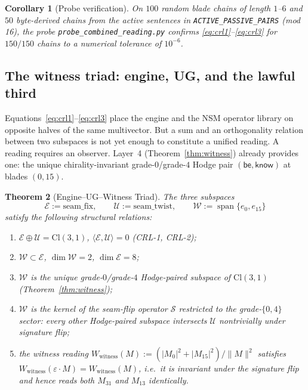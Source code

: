 \documentclass[11pt,a4paper]{article}
\theoremstyle{plain}
\newtheorem{theorem}{Theorem}[section]
\newtheorem{corollary}[theorem]{Corollary}
\theoremstyle{definition}
\theoremstyle{remark}
\numberwithin{equation}{section}
\providecommand{\Cl}{\mathrm{Cl}}
\providecommand{\eps}{\varepsilon}
\DeclareMathOperator{\Span}{span}
\begin{document}
\begin{corollary}[Probe verification]
\label{cor:crl-verified}
On $100$ random blade chains of length $1$--$6$ and $50$
byte-derived chains from the active sentences in
\texttt{ACTIVE\_PASSIVE\_PAIRS} (mod 16), the
probe \texttt{probe\_combined\_reading.py} confirms
\eqref{eq:crl1}--\eqref{eq:crl3} for $150/150$ chains to a
numerical tolerance of $10^{-6}$.
\end{corollary}

\subsection{The witness triad: engine, UG, and the lawful third}
\label{sec:triad}

Equations~\eqref{eq:crl1}--\eqref{eq:crl3} place the engine and the
NSM operator library on opposite halves of the same multivector.
But a sum and an orthogonality relation between two subspaces is
not yet enough to constitute a unified reading.  A reading
requires an observer.  Layer~4 (Theorem~\ref{thm:witness}) already
provides one: the unique chirality-invariant grade-$0$/grade-$4$
Hodge pair $(\mathsf{be}, \mathsf{know})$ at blades $(0, 15)$.

\begin{theorem}[Engine--UG--Witness Triad]\label{thm:triad}
The three subspaces
\[
  \mathcal{E} := \mathrm{seam\_fix},
  \qquad
  \mathcal{U} := \mathrm{seam\_twist},
  \qquad
  \mathcal{W} := \Span\{e_0, e_{15}\}
\]
satisfy the following structural relations:
\begin{enumerate}[label=(\roman*)]
\item $\mathcal{E} \oplus \mathcal{U} = \Cl(3,1)$,
      $\langle \mathcal{E}, \mathcal{U} \rangle = 0$ (CRL-1, CRL-2);
\item $\mathcal{W} \subset \mathcal{E}$, $\dim \mathcal{W} = 2$,
      $\dim \mathcal{E} = 8$;
\item $\mathcal{W}$ is the \emph{unique} grade-$0$/grade-$4$
      Hodge-paired subspace of $\Cl(3,1)$
      (Theorem~\ref{thm:witness});
\item $\mathcal{W}$ is the kernel of the seam-flip operator
      $\mathcal{S}$ restricted to the grade-$\{0, 4\}$ sector:
      every other Hodge-paired subspace intersects
      $\mathcal{U}$ nontrivially under signature flip;
\item the witness reading
      $W_{\mathrm{witness}}(M)
       := (|M_0|^2 + |M_{15}|^2) / \|M\|^2$
      satisfies $W_{\mathrm{witness}}(\eps \cdot M) =
      W_{\mathrm{witness}}(M)$, i.e.\ it is invariant under the
      signature flip and hence reads both $M_{31}$ and $M_{13}$
      identically.
\end{enumerate}
\end{theorem}
\end{document}
